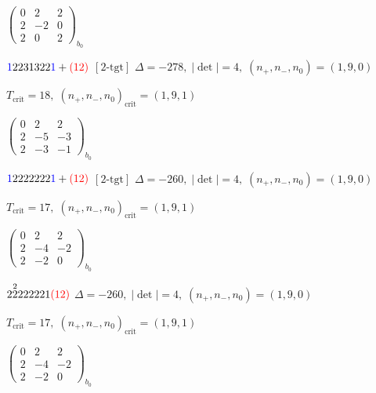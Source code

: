 \documentclass[10pt]{article}
\begin{document}
\hspace{2em}$\left(\begin{smallmatrix}0 & 2 & 2 \\ 2 & -2 & 0 \\ 2 & 0 & 2\end{smallmatrix}\right)_{\!b_0}$

\smallskip

$\textcolor{blue}{1}2231322\textcolor{blue}{1}+\textcolor{red}{(12)}$ $\scriptstyle [2\text{-tgt}]$ \quad $\Delta=-278,\; |\det|=4,\; (n_+,n_-,n_0)=(1,9,0)$

\hspace{1em}$T_{\text{crit}}=18,\; (n_+,n_-,n_0)_{\text{crit}}=(1,9,1)$

\hspace{2em}$\left(\begin{smallmatrix}0 & 2 & 2 \\ 2 & -5 & -3 \\ 2 & -3 & -1\end{smallmatrix}\right)_{\!b_0}$

\smallskip

$\textcolor{blue}{1}2222222\textcolor{blue}{1}+\textcolor{red}{(12)}$ $\scriptstyle [2\text{-tgt}]$ \quad $\Delta=-260,\; |\det|=4,\; (n_+,n_-,n_0)=(1,9,0)$

\hspace{1em}$T_{\text{crit}}=17,\; (n_+,n_-,n_0)_{\text{crit}}=(1,9,1)$

\hspace{2em}$\left(\begin{smallmatrix}0 & 2 & 2 \\ 2 & -4 & -2 \\ 2 & -2 & 0\end{smallmatrix}\right)_{\!b_0}$

\smallskip

$2\overset{2}{2}222221\textcolor{red}{(12)}$ \quad $\Delta=-260,\; |\det|=4,\; (n_+,n_-,n_0)=(1,9,0)$

\hspace{1em}$T_{\text{crit}}=17,\; (n_+,n_-,n_0)_{\text{crit}}=(1,9,1)$

\hspace{2em}$\left(\begin{smallmatrix}0 & 2 & 2 \\ 2 & -4 & -2 \\ 2 & -2 & 0\end{smallmatrix}\right)_{\!b_0}$
\end{document}
